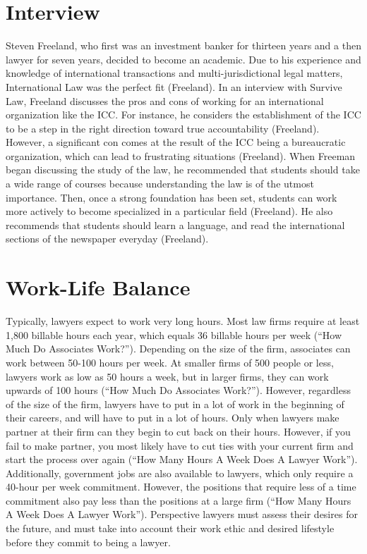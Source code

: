 \begin{multicols}{2}
\section{Interview}
    Steven Freeland, who first was an investment banker for thirteen years and a then lawyer for seven years, decided to become an academic. Due to his experience and knowledge of international transactions and multi-jurisdictional legal matters, International Law was the perfect fit (Freeland). In an interview with Survive Law, Freeland discusses the pros and cons of working for an international organization like the ICC. For instance, he considers the establishment of the ICC to be a step in the right direction toward true accountability (Freeland). However, a significant con comes at the result of the ICC being a bureaucratic organization, which can lead to frustrating situations (Freeland). When Freeman began discussing the study of the law, he recommended that students should take a wide range of courses because understanding the law is of the utmost importance. Then, once a strong foundation has been set, students can work more actively to become specialized in a particular field (Freeland). He also recommends that students should learn a language, and read the international sections of the newspaper everyday (Freeland).
\section{Work-Life Balance}
    Typically, lawyers expect to work very long hours. Most law firms require at least 1,800 billable hours each year, which equals 36 billable hours per week (“How Much Do Associates Work?”). Depending on the size of the firm, associates can work between 50-100 hours per week. At smaller firms of 500 people or less, lawyers work as low as 50 hours a week, but in larger firms, they can work upwards of 100 hours (“How Much Do Associates Work?”). However, regardless of the size of the firm, lawyers have to put in a lot of work in the beginning of their careers, and will have to put in a lot of hours. Only when lawyers make partner at their firm can they begin to cut back on their hours. However, if you fail to make partner, you most likely have to cut ties with your current firm and start the process over again (“How Many Hours A Week Does A Lawyer Work”). Additionally, government jobs are also available to lawyers, which only require a 40-hour per week commitment. However, the positions that require less of a time commitment also pay less than the positions at a large firm (“How Many Hours A Week Does A Lawyer Work”). Perspective lawyers must assess their desires for the future, and must take into account their work ethic and desired lifestyle before they commit to being a lawyer.
\end{multicols}